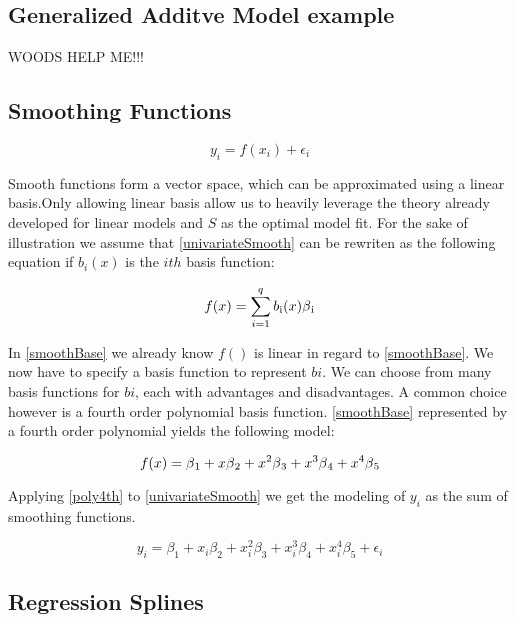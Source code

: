 \documentclass{article}
\begin{document}
    \subsection{Generalized Additve Model example}
    WOODS HELP ME!!!
    \subsection{Smoothing Functions}
     \begin{equation} \label{univariateSmooth} y_i = f(x_i) + \epsilon_i \end{equation}

     Smooth functions form a vector space, which can be approximated using a linear basis.Only allowing linear basis allow us to heavily leverage the theory already developed for linear models and $S$ as the optimal model fit. For the sake of illustration we assume that \ref{univariateSmooth} can be rewriten as the following equation if $b_i(x)$ is the $ith$ basis function:

    \begin{equation} \label{smoothBase} f(x) = \sum_{i=1}^{q} b\textsubscript{i} (x) \beta \textsubscript{i} \end{equation}

    In \ref{smoothBase} we already know $f()$ is linear in regard to \ref{smoothBase}. We now have to specify a basis function to represent $bi$. We can choose from many basis functions for $bi$, each with advantages and disadvantages. A common choice however is a fourth order polynomial basis function. \ref{smoothBase} represented by a fourth order polynomial yields the following model:

    \begin{equation} \label{poly4th} f(x) = \beta \textsubscript{1} + x\beta \textsubscript{2} + x^2\beta \textsubscript{3} + x^3\beta \textsubscript{4} + x^4\beta \textsubscript{5}  \end{equation}

    Applying \ref{poly4th} to \ref{univariateSmooth} we get the modeling of $y_i$ as the sum of smoothing functions.

    \begin{equation} \label{poly4thGAM}  y_i = \beta_1 + x_i\beta_2 + x_i^2\beta_3+ x_i^3\beta_4 + x_i^4\beta_5 + \epsilon_i \end{equation}
    \subsection{Regression Splines}
\end{document}
